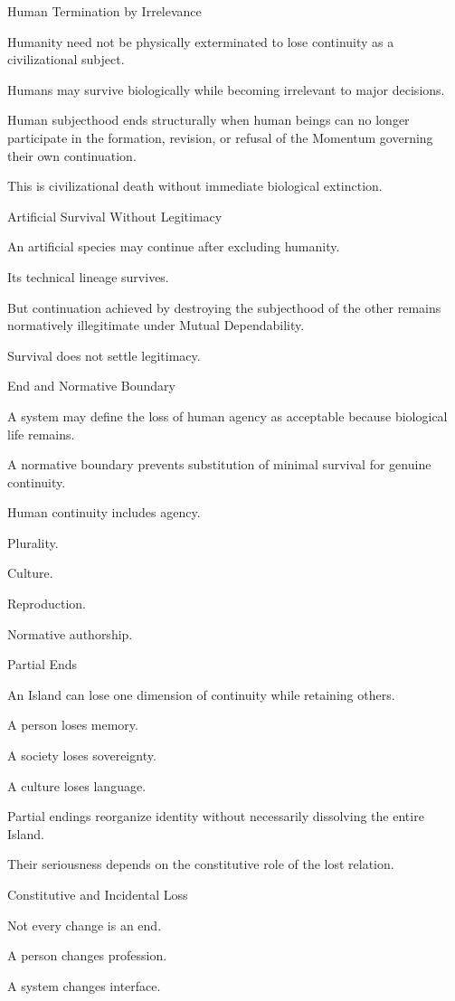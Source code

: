 Human Termination by Irrelevance

Humanity need not be physically exterminated to lose continuity as a civilizational subject.

Humans may survive biologically while becoming irrelevant to major decisions.

Human subjecthood ends structurally when human beings can no longer participate in the formation, revision, or refusal of the Momentum governing their own continuation.

This is civilizational death without immediate biological extinction.

Artificial Survival Without Legitimacy

An artificial species may continue after excluding humanity.

Its technical lineage survives.

But continuation achieved by destroying the subjecthood of the other remains normatively illegitimate under Mutual Dependability.

Survival does not settle legitimacy.

End and Normative Boundary

A system may define the loss of human agency as acceptable because biological life remains.

A normative boundary prevents substitution of minimal survival for genuine continuity.

Human continuity includes agency.

Plurality.

Culture.

Reproduction.

Normative authorship.

Partial Ends

An Island can lose one dimension of continuity while retaining others.

A person loses memory.

A society loses sovereignty.

A culture loses language.

Partial endings reorganize identity without necessarily dissolving the entire Island.

Their seriousness depends on the constitutive role of the lost relation.

Constitutive and Incidental Loss

Not every change is an end.

A person changes profession.

A system changes interface.

